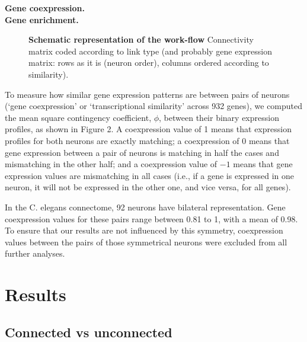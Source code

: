 \documentclass[10pt,letterpaper]{article}
\begin{document}
\textbf{Gene coexpression.}\\

\textbf{Gene enrichment.}


 \begin{figure}[!h]
 \caption{{\bf Schematic representation of the work-flow}
Connectivity matrix coded according to link type (and probably gene expression matrix: rows as it is (neuron order), columns ordered according to similarity).}
 \label{fig:SchematicRepresentation}
 \end{figure}

To measure how similar gene expression patterns are between pairs of neurons (`gene coexpression' or `transcriptional similarity' across 932 genes), we computed the mean square contingency coefficient, $\phi$, between their binary expression profiles, as shown in Figure 2.
A coexpression value of 1 means that expression profiles for both neurons are exactly matching; a coexpression of 0 means that gene expression between a pair of neurons is matching in half the cases and mismatching in the other half; and a coexpression value of $-1$ means that gene expression values are mismatching in all cases (i.e., if a gene is expressed in one neuron, it will not be expressed in the other one, and vice versa, for all genes).

In the C. elegans connectome, 92 neurons have bilateral representation.
Gene coexpression values for these pairs range between 0.81 to 1, with a mean of 0.98.
To ensure that our results are not influenced by this symmetry, coexpression values between the pairs of those symmetrical neurons were excluded from all further analyses.



\section*{Results}
\subsection*{Connected vs unconnected}
\end{document}
